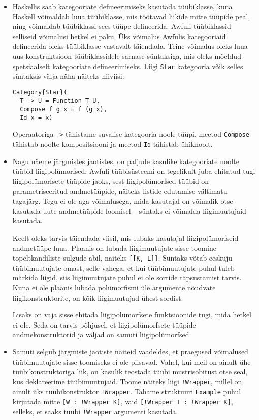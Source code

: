 \documentclass[12pt]{article}
\begin{document}
        \begin{itemize}
          \item
            Haskellis saab kategooriate defineerimiseks kasutada tüübiklasse, kuna Haskell võimaldab luua tüübiklasse, mis töötavad liikide mitte tüüpide peal, ning võimaldab tüübiklassi sees tüüpe defineerida. Awfuli tüübiklassid selliseid võimalusi hetkel ei paku. Üks võimalus Awfulis kategooriaid defineerida oleks tüübiklasse vastavalt täiendada. Teine võimalus oleks luua uus konstruktsioon tüübiklassidele sarnase süntaksiga, mis oleks mõeldud spetsiaalselt kategooriate defineerimiseks. Liigi \verb!Star! kategooria võik selles süntaksis välja näha näiteks niiviisi:

            \begin{verbatim}Category{Star}(
  T -> U = Function T U,
  Compose f g x = f (g x),
  Id x = x)\end{verbatim}

            Operaatoriga \verb!->! tähistame suvalise kategooria noole tüüpi, meetod \verb!Compose! tähistab noolte kompositsiooni ja meetod \verb!Id! tähistab ühiknoolt.
          \item
            Nagu näeme järgmistes jaotistes, on paljude kasulike kategooriate noolte tüübid liigipolümorfsed. Awfuli tüübisüsteemi on tegelikult juba ehitatud tugi liigipolümorfsete tüüpide jaoks, sest liigipolümorfsed tüübid on parametriseeritud andmetüüpide, näiteks listide edutamise vältimatu tagajärg. Tegu ei ole aga võimalusega, mida kasutajal on võimalik otse kasutada uute andmetüüpide loomisel -- süntaks ei võimalda liigimuutujaid kasutada.

            Keelt oleks tarvis täiendada viisil, mis lubaks kasutajal liigipolümorfseid andmetüüpe luua. Plaanis on lubada liigimuutujate sisse toomine topeltkandiliste sulgude abil, näiteks \verb![[K, L]]!. Süntaks võtab eeskuju tüübimuutujate omast, selle vahega, et kui tüübimuutujate puhul tuleb märkida liigid, siis liigimuutujate puhul ei ole sortide täpsustamist tarvis. Kuna ei ole plaanis lubada polümorfismi üle argumente nõudvate liigikonstruktorite, on kõik liigimuutujad ühest sordist.

            Lisaks on vaja sisse ehitada liigipolümorfsete funktsioonide tugi, mida hetkel ei ole. Seda on tarvis põhjusel, et liigipolümorfsete tüüpide andmekonstruktorid ja väljad on samuti liigipolümorfsed.
          \item
            Samuti selgub järgmiste jaotiste näiteid vaadeldes, et praegused võimalused tüübimuutujate sisse toomiseks ei ole piisavad. Vahel, kui meil on ainult ühe tüübikonstruktoriga liik, on kasulik teostada tüübi mustrisobitust otse seal, kus deklareerime tüübimuutujaid. Toome näiteks liigi \verb"!Wrapper", millel on ainult üks tüübikonstruktor \verb"!Wrapper". Tahame struktuuri \verb!Example! puhul kirjutada mitte \verb"[W : !Wrapper K]", vaid \verb"[!Wrapper T : !Wrapper K]", selleks, et saaks tüübi \verb"!Wrapper" argumenti kasutada.


\end{itemize}
\end{document}
